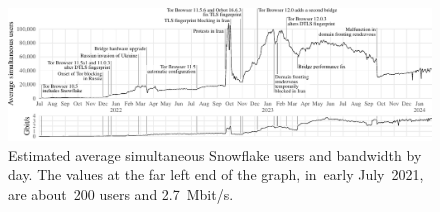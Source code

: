 \documentclass[letterpaper,twocolumn]{article}
\begin{document}
\begin{figure}[t]
\includegraphics{figures/users/users-global}
\caption{
Estimated average simultaneous Snowflake users and bandwidth by day.
The values at the far left end of the graph,
in~early July~2021, are about~200 users
and 2.7~Mbit/s.
}
\end{figure}
\end{document}
